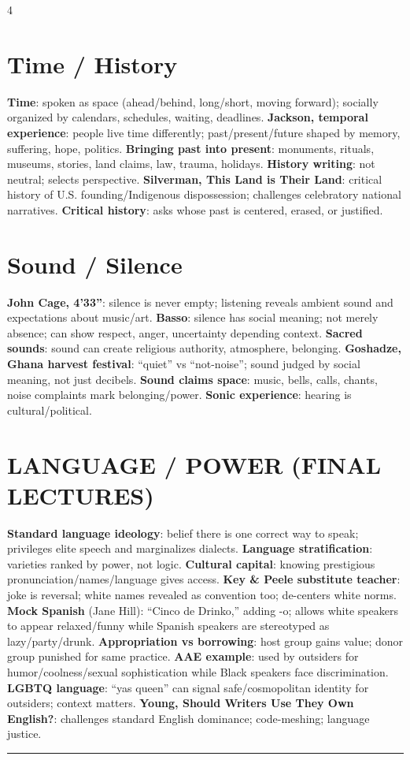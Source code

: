 \documentclass[10pt,landscape]{article}
\newcommand{\kw}[1]{\textbf{#1}}
\newcommand{\sep}{\vspace{0.8pt}\hrule\vspace{0.8pt}}
\begin{document}
\begin{multicols*}{4}
\section*{Time / History}
\kw{Time}: spoken as space (ahead/behind, long/short, moving forward); socially organized by calendars, schedules, waiting, deadlines. \kw{Jackson, temporal experience}: people live time differently; past/present/future shaped by memory, suffering, hope, politics. \kw{Bringing past into present}: monuments, rituals, museums, stories, land claims, law, trauma, holidays. \kw{History writing}: not neutral; selects perspective. \kw{Silverman, This Land is Their Land}: critical history of U.S. founding/Indigenous dispossession; challenges celebratory national narratives. \kw{Critical history}: asks whose past is centered, erased, or justified.

\section*{Sound / Silence}
\kw{John Cage, 4'33''}: silence is never empty; listening reveals ambient sound and expectations about music/art. \kw{Basso}: silence has social meaning; not merely absence; can show respect, anger, uncertainty depending context. \kw{Sacred sounds}: sound can create religious authority, atmosphere, belonging. \kw{Goshadze, Ghana harvest festival}: ``quiet'' vs ``not-noise''; sound judged by social meaning, not just decibels. \kw{Sound claims space}: music, bells, calls, chants, noise complaints mark belonging/power. \kw{Sonic experience}: hearing is cultural/political.

\section*{LANGUAGE / POWER (FINAL LECTURES)}
\kw{Standard language ideology}: belief there is one correct way to speak; privileges elite speech and marginalizes dialects. \kw{Language stratification}: varieties ranked by power, not logic. \kw{Cultural capital}: knowing prestigious pronunciation/names/language gives access. \kw{Key \& Peele substitute teacher}: joke is reversal; white names revealed as convention too; de-centers white norms. \kw{Mock Spanish} (Jane Hill): ``Cinco de Drinko,'' adding -o; allows white speakers to appear relaxed/funny while Spanish speakers are stereotyped as lazy/party/drunk. \kw{Appropriation vs borrowing}: host group gains value; donor group punished for same practice. \kw{AAE example}: used by outsiders for humor/coolness/sexual sophistication while Black speakers face discrimination. \kw{LGBTQ language}: ``yas queen'' can signal safe/cosmopolitan identity for outsiders; context matters. \kw{Young, Should Writers Use They Own English?}: challenges standard English dominance; code-meshing; language justice.
\sep

\end{multicols*}
\end{document}
